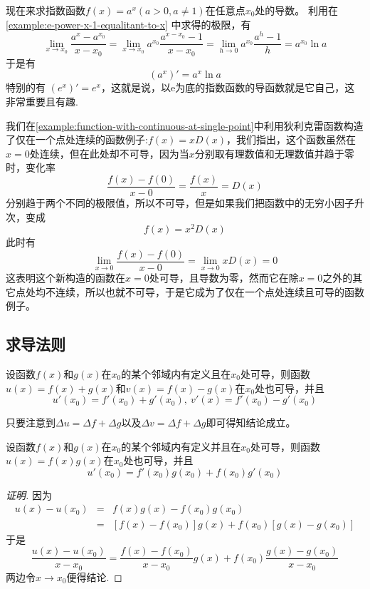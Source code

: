\begin{example}
  现在来求指数函数$f(x)=a^x(a>0,a\neq 1)$在任意点$x_0$处的导数。
  利用在 \autoref{example:e-power-x-1-equalitant-to-x} 中求得的极限，有
  \[ \lim_{x \to x_0} \frac{a^{x}-a^{x_0}}{x-x_0} = \lim_{x \to x_0} a^{x_0} \frac{a^{x-x_0}-1}{x-x_0} = \lim_{h \to 0} a^{x_0} \frac{a^h-1}{h} = a^{x_0} \ln{a} \]
  于是有
  \[ (a^x)' = a^x \ln{a} \]
  特别的有 $(e^x)'=e^x$，这就是说，以$\mathrm{e}$为底的指数函数的导函数就是它自己，这非常重要且有趣.
\end{example}

\begin{example}
  我们在\autoref{example:function-with-continuous-at-single-point}中利用狄利克雷函数构造了仅在一个点处连续的函数例子:$f(x)=xD(x)$，我们指出，这个函数虽然在$x=0$处连续，但在此处却不可导，因为当$x$分别取有理数值和无理数值并趋于零时，变化率
  \[ \frac{f(x)-f(0)}{x-0} = \frac{f(x)}{x} = D(x) \]
  分别趋于两个不同的极限值，所以不可导，但是如果我们把函数中的无穷小因子升次，变成
  \[ f(x)=x^2D(x) \]
  此时有
  \[ \lim_{x \to 0} \frac{f(x)-f(0)}{x-0} = \lim_{x \to 0} xD(x) = 0 \]
  这表明这个新构造的函数在$x=0$处可导，且导数为零，然而它在除$x=0$之外的其它点处均不连续，所以也就不可导，于是它成为了仅在一个点处连续且可导的函数例子。
\end{example}

\subsection{求导法则}
\label{sec:rule-of-derivative}

\begin{theorem}
  设函数$f(x)$和$g(x)$在$x_0$的某个邻域内有定义且在$x_0$处可导，则函数$u(x)=f(x)+g(x)$和$v(x)=f(x)-g(x)$在$x_0$处也可导，并且
  \[ u'(x_0)=f'(x_0)+g'(x_0), \  v'(x)=f'(x_0)-g'(x_0) \]
\end{theorem}

只要注意到$\Delta u=\Delta f+\Delta g$以及$\Delta v=\Delta f+ \Delta g$即可得知结论成立。

\begin{theorem}
  设函数$f(x)$和$g(x)$在$x_0$的某个邻域内有定义并且在$x_0$处可导，则函数$u(x)=f(x)g(x)$在$x_0$处也可导，并且
  \[ u'(x_0)=f'(x_0)g(x_0)+f(x_0)g'(x_0) \]
\end{theorem}

\begin{proof}[证明]
  因为
  \begin{eqnarray*}
    u(x)-u(x_0) & = & f(x)g(x)-f(x_0)g(x_0) \\
                & = & [f(x)-f(x_0)]g(x)+f(x_0)[g(x)-g(x_0)]
  \end{eqnarray*}
  于是
  \[ \frac{u(x)-u(x_0)}{x-x_0} = \frac{f(x)-f(x_0)}{x-x_0}g(x)+f(x_0)\frac{g(x)-g(x_0)}{x-x_0} \]
  两边令$x \to x_0$便得结论.
\end{proof}


